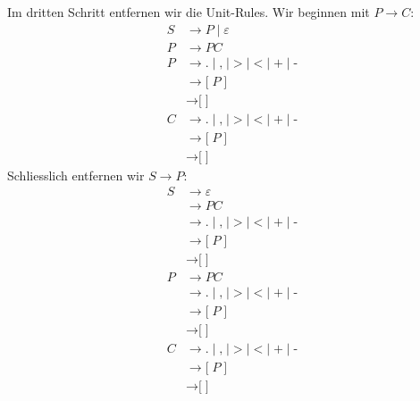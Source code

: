 \begin{loesung}
Im dritten Schritt entfernen wir die Unit-Rules.
Wir beginnen mit $P\to C$:
\begin{align*}
S&\rightarrow P
\;|\;\varepsilon
\\
P&\rightarrow P C
\\
P&\rightarrow
\texttt{.} \;|\;
\texttt{,} \;|\;
\texttt{>} \;|\;
\texttt{<} \;|\;
\texttt{+} \;|\;
\texttt{-}
\\
&\rightarrow \texttt{[} \; P \; \texttt{]}
\\
&\rightarrow \texttt{[} \; \texttt{]}
\\
C&\rightarrow
\texttt{.} \;|\;
\texttt{,} \;|\;
\texttt{>} \;|\;
\texttt{<} \;|\;
\texttt{+} \;|\;
\texttt{-}
\\
&\rightarrow \texttt{[} \; P \; \texttt{]}
\\
&\rightarrow \texttt{[} \; \texttt{]}
\end{align*}
Schliesslich entfernen wir $S\to P$:
\begin{align*}
S&\rightarrow\varepsilon
\\
&\rightarrow P C
\\
&\rightarrow
\texttt{.} \;|\;
\texttt{,} \;|\;
\texttt{>} \;|\;
\texttt{<} \;|\;
\texttt{+} \;|\;
\texttt{-}
\\
&\rightarrow \texttt{[} \; P \; \texttt{]}
\\
&\rightarrow \texttt{[} \; \texttt{]}
\\
P&\rightarrow P C
\\
&\rightarrow
\texttt{.} \;|\;
\texttt{,} \;|\;
\texttt{>} \;|\;
\texttt{<} \;|\;
\texttt{+} \;|\;
\texttt{-}
\\
&\rightarrow \texttt{[} \; P \; \texttt{]}
\\
&\rightarrow \texttt{[} \; \texttt{]}
\\
C&\rightarrow
\texttt{.} \;|\;
\texttt{,} \;|\;
\texttt{>} \;|\;
\texttt{<} \;|\;
\texttt{+} \;|\;
\texttt{-}
\\
&\rightarrow \texttt{[} \; P \; \texttt{]}
\\
&\rightarrow \texttt{[} \; \texttt{]}
\end{align*}


\end{loesung}
